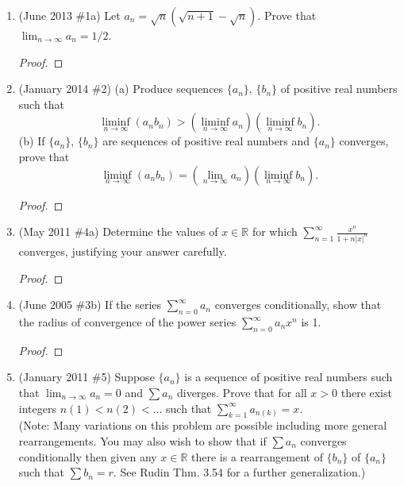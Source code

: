 \documentclass[reqno]{article}
\theoremstyle{remark}
\numberwithin{equation}{section}
\newcommand{\R}{\mathbb{R}}
\begin{document}
    \begin{enumerate}
	
	\item (June 2013 \#1a) Let $a_n =\sqrt{n}\left(\sqrt{n+1}-\sqrt{n}\right)$.  Prove that $\lim_{n\to\infty}a_n=1/2$.
	
	\begin{proof}
	
	\end{proof}
		 	 
	\item (January 2014 \#2) (a) Produce sequences $\{a_n\},\,\{b_n\}$ of positive real numbers such that $$\liminf_{n\to\infty}(a_nb_n)>\left(\liminf_{n\to\infty} a_n\right) \left(\liminf_{n\to\infty} b_n\right).$$ (b) If $\{a_n\},\,\{b_n\}$ are sequences of positive real numbers and $\{a_n\}$ converges, prove that $$\liminf_{n\to\infty}(a_nb_n)=\left(\lim_{n\to\infty}a_n\right)\left(\liminf_{n\to\infty}b_n\right).$$
	
	\begin{proof}
	
	\end{proof}
	
	\item (May 2011 \#4a) Determine the values of $x\in\R$ for which $\displaystyle\sum_{n=1}^\infty \frac{x^n}{1+n|x|^n}$ converges, justifying your answer carefully.
	
	\begin{proof} 
	
	\end{proof} 
	
	\item (June 2005 \#3b) If the series $\sum_{n=0}^\infty a_n$ converges conditionally, show that the radius of convergence of the power series $\sum_{n=0}^\infty a_nx^n$ is 1.
	
	\begin{proof}
	
	\end{proof}
	
	\item (January 2011 \#5) Suppose $\{a_n\}$ is a sequence of positive real numbers such that $\lim_{n\to\infty}a_n=0$ and $\sum a_n$ diverges. Prove that for all $x>0$ there exist integers $n(1)<n(2)<\ldots$ such that $\sum_{k=1}^\infty a_{n(k)}=x$.\\
	(Note: Many variations on this problem are possible including more general rearrangements.  You may also wish to show that if $\sum a_n$ converges conditionally then given any $x\in\R$ there is a rearrangement of $\{b_n\}$ of $\{a_n\}$ such that $\sum b_n=r$.  See Rudin Thm. 3.54 for a further generalization.)
	

\end{enumerate}
\end{document}
